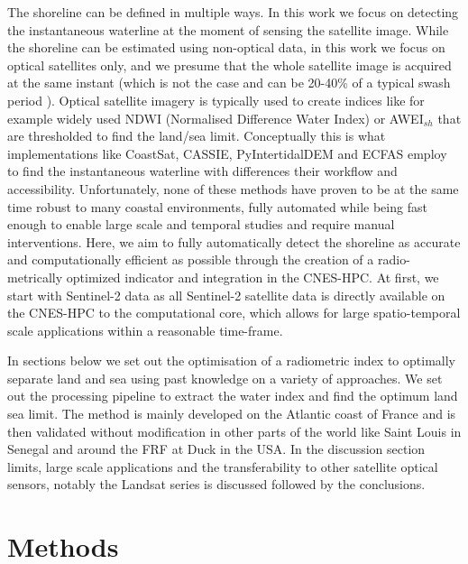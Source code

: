 \documentclass[remotesensing,article,submit,pdftex,moreauthors]{Definitions/mdpi}
\begin{document}
The shoreline can be defined in multiple ways. In this work we focus on detecting the instantaneous waterline at the moment of sensing the satellite image. While the shoreline can be estimated using non-optical data, in this work we focus on optical satellites only, and we presume that the whole satellite image is acquired at the same instant (which is not the case and can be 20-40\% of a typical swash period \citep{binet2022accurate}). Optical satellite imagery is typically used to create indices like for example widely used NDWI (Normalised Difference Water Index) or AWEI$_{sh}$ that are thresholded to find the land/sea limit. Conceptually this is what implementations like CoastSat, CASSIE, PyIntertidalDEM and ECFAS employ to find the instantaneous waterline with differences their workflow and accessibility. Unfortunately, none of these methods have proven to be at the same time robust to many coastal environments, fully automated while being fast enough to enable large scale and temporal studies and require manual interventions. Here, we aim to fully automatically detect the shoreline as accurate and computationally efficient as possible through the creation of a radio-metrically optimized indicator and integration in the CNES-HPC. At first, we start with Sentinel-2 data as all Sentinel-2 satellite data is directly available on the CNES-HPC to the computational core, which allows for large spatio-temporal scale applications within a reasonable time-frame.

In sections below we set out the optimisation of a radiometric index to optimally separate land and sea using past knowledge on a variety of approaches. We set out the processing pipeline to extract the water index and find the optimum land sea limit. The method is mainly developed on the Atlantic coast of France and is then validated without modification in other parts of the world like Saint Louis in Senegal and around the FRF at Duck in the USA. In the discussion section limits, large scale applications and the transferability to other satellite optical sensors, notably the Landsat series is discussed followed by the conclusions.

\section{Methods}
\end{document}
